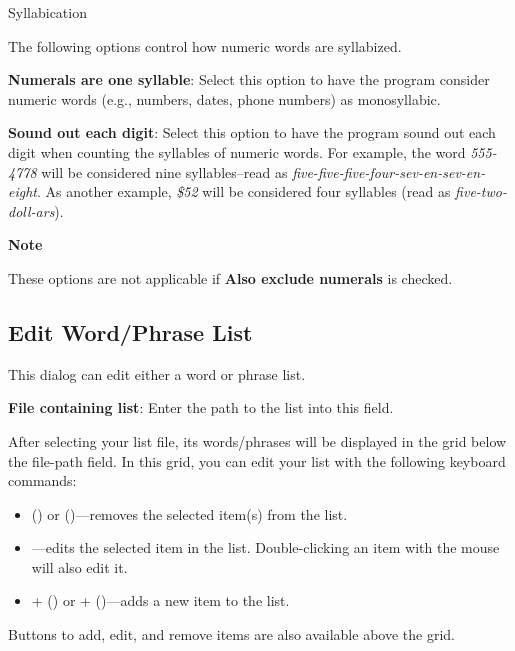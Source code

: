 \documentclass[
]{book}
\providecommand{\tightlist}{%
  \setlength{\itemsep}{0pt}\setlength{\parskip}{0pt}}
\newenvironment{notesection}
    {
    \begin{tcolorbox}[colframe=mediumblue,colback=lightblue,coltext=mediumblue,arc=3mm]
    \faLightbulb[regular] \textbf{Note} \newline
    }
    {
    \end{tcolorbox}
    }
\newenvironment{optionssection}
    {
    \begin{tcolorbox}[colframe=lightgray,colback=ultralightgray,sharp corners=all,parbox=false]
    }
    {
    \end{tcolorbox}
    }
\newenvironment{optionssectiontitle}
    {
    \begin{tcolorbox}[colframe=lightgray,colback=lightgray]
    \bfseries
    }
    {
    \end{tcolorbox}
    }
\theoremstyle{definition}
\theoremstyle{definition}
\theoremstyle{definition}
\theoremstyle{definition}
\theoremstyle{remark}
\begin{document}
\begin{optionssection}

\begin{optionssectiontitle}
Syllabication

\end{optionssectiontitle}

The following options control how numeric words are syllabized.

\textbf{Numerals are one syllable}: Select this option to have the program consider numeric words (e.g., numbers, dates, phone numbers) as monosyllabic.

\textbf{Sound out each digit}: Select this option to have the program sound out each digit when counting the syllables of numeric words. For example, the word \emph{555-4778} will be considered nine syllables--read as \emph{five-five-five-four-sev-en-sev-en-eight}. As another example, \emph{\$52} will be considered four syllables (read as \emph{five-two-doll-ars}).

\end{optionssection}

\begin{notesection}
These options are not applicable if \textbf{Also exclude numerals} is checked.

\end{notesection}

\hypertarget{edit-word-list-dialog}{%
\subsection*{Edit Word/Phrase List}\label{edit-word-list-dialog}}

This dialog can edit either a word or phrase list.

\textbf{File containing list}: Enter the path to the list into this field.

\begin{minipage}{\textwidth}
After selecting your list file, its words/phrases will be displayed in the grid below the file-path field. In this grid, you can edit your list with the following keyboard commands:

\begin{itemize}
\tightlist
\item
   (\faWindows) or \keys{\backdel} (\faApple)---removes the selected item(s) from the list.
\item
  ---edits the selected item in the list. Double-clicking an item with the mouse will also edit it.
\item
  + (\faWindows) or \keys{\cmd}+ (\faApple)---adds a new item to the list.
\end{itemize}

Buttons to add, edit, and remove items are also available above the grid.

\end{minipage}
\end{document}
